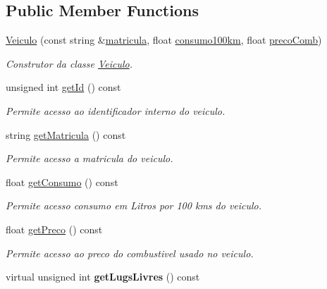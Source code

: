 \subsection*{Public Member Functions}
\begin{DoxyCompactItemize}
\item 
\mbox{\hyperlink{class_veiculo_a49f6527e767c1ca17a56c84729563ade}{Veiculo}} (const string \&\mbox{\hyperlink{class_veiculo_ad9cd698bf39e90508cd0700ee3b9d90b}{matricula}}, float \mbox{\hyperlink{class_veiculo_a06533b15de432c2d6ee86057d35dc547}{consumo100km}}, float \mbox{\hyperlink{class_veiculo_a1b3f7e8c716e8fd68ec7c7405f18c1ef}{preco\+Comb}})
\begin{DoxyCompactList}\small\item\em Construtor da classe \mbox{\hyperlink{class_veiculo}{Veiculo}}. \end{DoxyCompactList}\item 
unsigned int \mbox{\hyperlink{class_veiculo_aeb0746b1f86094cd9b5689c8c83af98d}{get\+Id}} () const
\begin{DoxyCompactList}\small\item\em Permite acesso ao identificador interno do veiculo. \end{DoxyCompactList}\item 
string \mbox{\hyperlink{class_veiculo_ac41e88b8567d6fca2e932d2df3fd23b5}{get\+Matricula}} () const
\begin{DoxyCompactList}\small\item\em Permite acesso a matricula do veiculo. \end{DoxyCompactList}\item 
float \mbox{\hyperlink{class_veiculo_a4d2607bc367820d260103327dfc502f4}{get\+Consumo}} () const
\begin{DoxyCompactList}\small\item\em Permite acesso consumo em Litros por 100 kms do veiculo. \end{DoxyCompactList}\item 
float \mbox{\hyperlink{class_veiculo_a9f553ab3febd3b756643533f065a289a}{get\+Preco}} () const
\begin{DoxyCompactList}\small\item\em Permite acesso ao preco do combustivel usado no veiculo. \end{DoxyCompactList}\item 
\mbox{\label{class_veiculo_a45ee157e20f9408b1c184ba0608178ba}} 
virtual unsigned int {\bfseries get\+Lugs\+Livres} () const

\end{DoxyCompactItemize}
